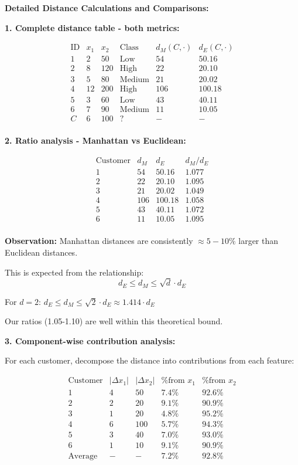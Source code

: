 \documentclass[12pt]{article}
\begin{document}
\begin{computation}
\textbf{Detailed Distance Calculations and Comparisons:}

\textbf{1. Complete distance table - both metrics:}

\[
\begin{array}{c|cc|c|c|c}
\text{ID} & x_1 & x_2 & \text{Class} & d_M(C, \cdot) & d_E(C, \cdot) \\
\hline
1 & 2 & 50 & \text{Low} & 54 & 50.16 \\
2 & 8 & 120 & \text{High} & 22 & 20.10 \\
3 & 5 & 80 & \text{Medium} & 21 & 20.02 \\
4 & 12 & 200 & \text{High} & 106 & 100.18 \\
5 & 3 & 60 & \text{Low} & 43 & 40.11 \\
6 & 7 & 90 & \text{Medium} & 11 & 10.05 \\
\hline
C & 6 & 100 & ? & - & - \\
\end{array}
\]

\textbf{2. Ratio analysis - Manhattan vs Euclidean:}

\[
\begin{array}{c|c|c|c}
\text{Customer} & d_M & d_E & d_M/d_E \\
\hline
1 & 54 & 50.16 & 1.077 \\
2 & 22 & 20.10 & 1.095 \\
3 & 21 & 20.02 & 1.049 \\
4 & 106 & 100.18 & 1.058 \\
5 & 43 & 40.11 & 1.072 \\
6 & 11 & 10.05 & 1.095 \\
\end{array}
\]

\textbf{Observation:} Manhattan distances are consistently \(\approx 5-10\%\) larger than Euclidean distances.

This is expected from the relationship:
\[
d_E \leq d_M \leq \sqrt{d} \cdot d_E
\]

For \(d=2\): \(d_E \leq d_M \leq \sqrt{2} \cdot d_E \approx 1.414 \cdot d_E\)

Our ratios (1.05-1.10) are well within this theoretical bound.

\textbf{3. Component-wise contribution analysis:}

For each customer, decompose the distance into contributions from each feature:

\[
\begin{array}{c|c|c|c|c}
\text{Customer} & |\Delta x_1| & |\Delta x_2| & \text{\% from } x_1 & \text{\% from } x_2 \\
\hline
1 & 4 & 50 & 7.4\% & 92.6\% \\
2 & 2 & 20 & 9.1\% & 90.9\% \\
3 & 1 & 20 & 4.8\% & 95.2\% \\
4 & 6 & 100 & 5.7\% & 94.3\% \\
5 & 3 & 40 & 7.0\% & 93.0\% \\
6 & 1 & 10 & 9.1\% & 90.9\% \\
\hline
\text{Average} & - & - & 7.2\% & 92.8\% \\
\end{array}
\]


\end{computation}
\end{document}
